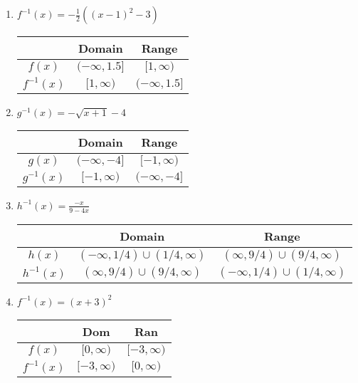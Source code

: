 \begin{enumerate}
	\item $f^{-1}(x) = -\frac{1}{2}\left((x-1)^2-3\right)$ \newline\\
     \begin{tabular}{c|c|c}
         &   Domain  &   Range   \\  \hline
         $f(x)$ & $(-\infty, 1.5]$ & $[1, \infty)$ \\ \hline
         $f^{-1}(x)$ & $[1, \infty)$ & $(-\infty, 1.5]$ \\ 
     \end{tabular}
     
     \item $g^{-1}(x) = -\sqrt{x+1}-4$   \newline\\
     \begin{tabular}{c|c|c}
         &   Domain  &   Range   \\  \hline
         $g(x)$ & $(-\infty, -4]$ & $[-1, \infty)$ \\ \hline
         $g^{-1}(x)$ & $[-1, \infty)$ & $(-\infty, -4]$ \\ 
     \end{tabular}
     
     \item $h^{-1}(x) = \frac{-x}{9-4x}$ \newline\\
     \begin{tabular}{c|c|c}
         &   Domain  &   Range   \\  \hline
         $h(x)$ & $(-\infty, 1/4) \cup (1/4, \infty) $ & $(\infty, 9/4) \cup (9/4, \infty)$ \\ \hline
         $h^{-1}(x)$ & $(\infty, 9/4) \cup (9/4, \infty)$ & $(-\infty, 1/4) \cup (1/4, \infty) $ \\ 
     \end{tabular}
         
     \item $f^{-1}(x) = (x+3)^2$ \newline\\
	\begin{tabular}{c|c|c}
            &   Dom             &   Ran \\  \hline
    $f(x)$  &   $[0,\infty)$    &   $[-3,\infty)$   \\  \hline
    $f^{-1}(x)$ &   $[-3,\infty)$   &   $[0,\infty)$    \\
\end{tabular}
     

\end{enumerate}
